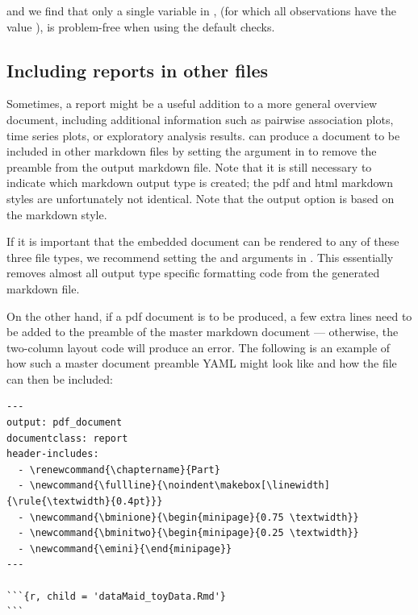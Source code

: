 \documentclass[article,shortnames]{jss}
\begin{document}
and we find that only a single variable in ,  (for which all
observations have the value ), is problem-free when using the default checks.


\subsection[Including dataMaid reports in other files]{Including  reports in other files}
Sometimes, a  report might be a useful addition to a
more general overview document, including additional information such
as pairwise association plots, time series plots, or exploratory
analysis results.   can produce a document to be
included in other  markdown files by setting the
 argument in  to remove the preamble
from the output  markdown file. Note that it is still
necessary to indicate which  markdown output type is
created; the pdf and html  markdown styles are
unfortunately not identical. Note that the  output option is based on the  markdown style. 

If it is important that the embedded  document can be
rendered to any of these three file types, we recommend setting the
 and  arguments in . This 
essentially removes almost all output type specific formatting code
from the generated  markdown file.

On the other hand, if a pdf document is to be produced, a few extra
lines need to be added to the preamble of the master  markdown
document --- otherwise, the two-column layout code will produce an
error. The following is an example of how such a master document
preamble YAML might look like and how the  file can
then be included:

{\small
\begin{Verbatim}
---
output: pdf_document
documentclass: report
header-includes:
  - \renewcommand{\chaptername}{Part}
  - \newcommand{\fullline}{\noindent\makebox[\linewidth]{\rule{\textwidth}{0.4pt}}}
  - \newcommand{\bminione}{\begin{minipage}{0.75 \textwidth}}
  - \newcommand{\bminitwo}{\begin{minipage}{0.25 \textwidth}}
  - \newcommand{\emini}{\end{minipage}}
---

```{r, child = 'dataMaid_toyData.Rmd'}
```
\end{Verbatim}
}
\end{document}
